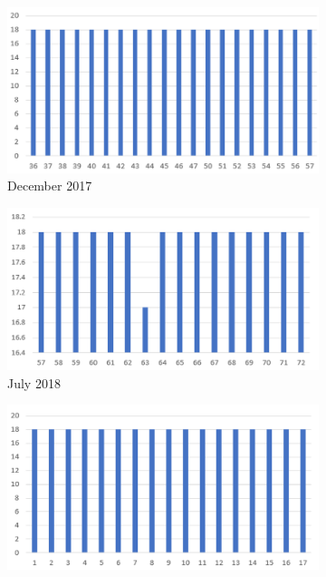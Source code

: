 \documentclass{l4proj}
\begin{document}
\begin{appendices}
\begin{figure}[h]
\begin{subfigure}[b]{0.43\textwidth}
        \includegraphics[width=\textwidth]{images/dataset-december2017.png}
        \caption{December 2017}
        \label{fig:dataset-december2017}
    \end{subfigure}
    \hfill
    \begin{subfigure}[b]{0.43\textwidth}
        \includegraphics[width=\textwidth]{images/dataset-july2018.png}
        \caption{July 2018}
        \label{fig:dataset-july2018}
    \end{subfigure}
    \hfill
    \begin{subfigure}[b]{0.43\textwidth}
        \includegraphics[width=\textwidth]{images/dataset-february2019.png}

\end{subfigure}
\end{figure}
\end{appendices}
\end{document}
